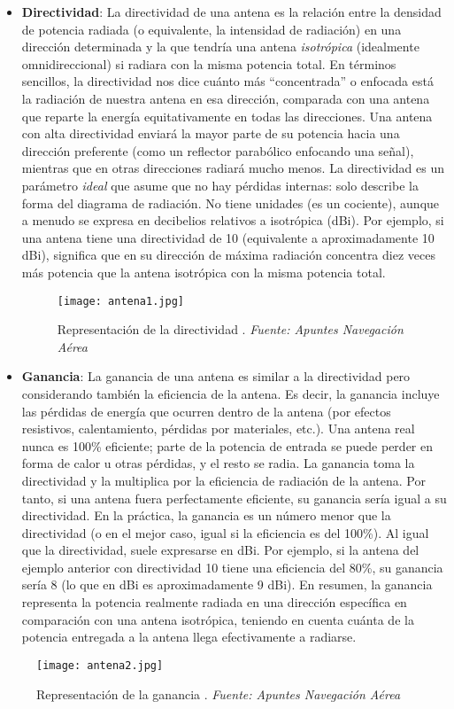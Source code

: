 \begin{itemize}
    \item \textbf{Directividad}: La directividad de una antena es la relación entre la densidad de potencia radiada (o equivalente, la intensidad de radiación) en una dirección determinada y la que tendría una antena \textit{isotrópica} (idealmente omnidireccional) si radiara con la misma potencia total. En términos sencillos, la directividad nos dice cuánto más “concentrada” o enfocada está la radiación de nuestra antena en esa dirección, comparada con una antena que reparte la energía equitativamente en todas las direcciones. Una antena con alta directividad enviará la mayor parte de su potencia hacia una dirección preferente (como un reflector parabólico enfocando una señal), mientras que en otras direcciones radiará mucho menos. La directividad es un parámetro \textit{ideal} que asume que no hay pérdidas internas: solo describe la forma del diagrama de radiación. No tiene unidades (es un cociente), aunque a menudo se expresa en decibelios relativos a isotrópica (dBi). Por ejemplo, si una antena tiene una directividad de 10 (equivalente a aproximadamente 10 dBi), significa que en su dirección de máxima radiación concentra diez veces más potencia que la antena isotrópica con la misma potencia total.\\
    
 \begin{figure}[H]
    \centering
    \texttt{[image: antena1.jpg]}
    \caption{\centering Representación de la directividad .\textit{ Fuente: Apuntes Navegación Aérea}}
\end{figure}
    
    \item \textbf{Ganancia}: La ganancia de una antena es similar a la directividad pero considerando también la eficiencia de la antena. Es decir, la ganancia incluye las pérdidas de energía que ocurren dentro de la antena (por efectos resistivos, calentamiento, pérdidas por materiales, etc.). Una antena real nunca es 100\% eficiente; parte de la potencia de entrada se puede perder en forma de calor u otras pérdidas, y el resto se radia. La ganancia toma la directividad y la multiplica por la eficiencia de radiación de la antena. Por tanto, si una antena fuera perfectamente eficiente, su ganancia sería igual a su directividad. En la práctica, la ganancia es un número menor que la directividad (o en el mejor caso, igual si la eficiencia es del 100\%). Al igual que la directividad, suele expresarse en dBi. Por ejemplo, si la antena del ejemplo anterior con directividad 10 tiene una eficiencia del 80\%, su ganancia sería 8 (lo que en dBi es aproximadamente 9 dBi). En resumen, la ganancia representa la potencia realmente radiada en una dirección específica en comparación con una antena isotrópica, teniendo en cuenta cuánta de la potencia entregada a la antena llega efectivamente a radiarse.\\
\end{itemize} 
 \begin{figure}[H]
    \centering
    \texttt{[image: antena2.jpg]}
    \caption{\centering Representación de la ganancia .\textit{ Fuente: Apuntes Navegación Aérea}}
\end{figure}

